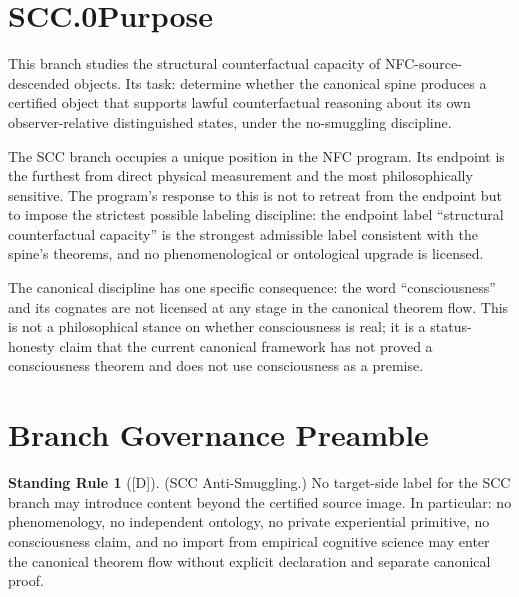 \documentclass[12pt,oneside]{amsbook}
\theoremstyle{plain}
\theoremstyle{definition}
\newtheorem{standingrule}[theorem]{Standing Rule}
\theoremstyle{remark}
\newcommand{\status}[1]{\textup{[#1]}}
\begin{document}
\bigskip

\section*{SCC.0\quad Purpose}

This branch studies the structural counterfactual capacity of
NFC-source-descended objects. Its task: determine whether the
canonical spine produces a certified object that supports lawful
counterfactual reasoning about its own observer-relative
distinguished states, under the no-smuggling discipline.

The SCC branch occupies a unique position in the NFC program.
Its endpoint is the furthest from direct physical measurement
and the most philosophically sensitive. The program's response
to this is not to retreat from the endpoint but to impose the
strictest possible labeling discipline: the endpoint label
``structural counterfactual capacity'' is the strongest
admissible label consistent with the spine's theorems, and no
phenomenological or ontological upgrade is licensed.

The canonical discipline has one specific consequence: the word
``consciousness'' and its cognates are not licensed at any stage
in the canonical theorem flow. This is not a philosophical
stance on whether consciousness is real; it is a status-honesty
claim that the current canonical framework has not proved a
consciousness theorem and does not use consciousness as a premise.

\section{Branch Governance Preamble}
\label{sec:governance}

\begin{standingrule}[\status{D}]\label{sr:scc-no-smuggling}
\textup{(SCC Anti-Smuggling.)} No target-side label for the
SCC branch may introduce content beyond the certified source
image. In particular: no phenomenology, no independent
ontology, no private experiential primitive, no consciousness
claim, and no import from empirical cognitive science may enter
the canonical theorem flow without explicit declaration and
separate canonical proof.
\end{standingrule}
\end{document}
